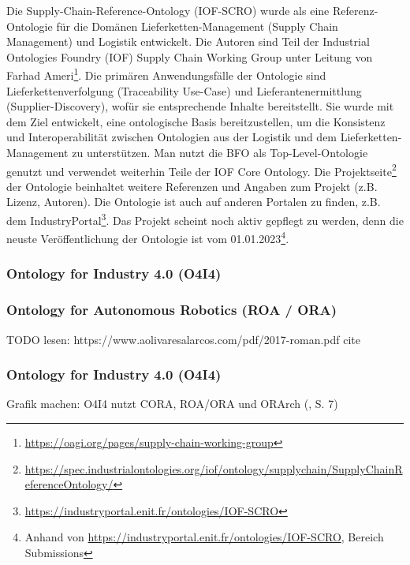 \documentclass{article}
\begin{document}
Die Supply-Chain-Reference-Ontology (IOF-SCRO) wurde als eine Referenz-Ontologie für die Domänen Lieferketten-Management (Supply Chain Management) und Logistik entwickelt\cite{ameri2020towards}.
Die Autoren sind Teil der Industrial Ontologies Foundry (IOF) Supply Chain Working Group unter Leitung von Farhad Ameri\footnote{\url{https://oagi.org/pages/supply-chain-working-group}}.
Die primären Anwendungsfälle der Ontologie sind Lieferkettenverfolgung (Traceability Use-Case) und Lieferantenermittlung (Supplier-Discovery), wofür sie entsprechende Inhalte bereitstellt.
Sie wurde mit dem Ziel entwickelt, eine ontologische Basis bereitzustellen, um die Konsistenz und Interoperabilität zwischen Ontologien aus der Logistik und dem Lieferketten-Management zu unterstützen.
Man nutzt die BFO als Top-Level-Ontologie genutzt und verwendet weiterhin Teile der IOF Core Ontology\cite{Kulvatunyou2022}.
Die Projektseite\footnote{\url{https://spec.industrialontologies.org/iof/ontology/supplychain/SupplyChainReferenceOntology/}} der Ontologie beinhaltet weitere Referenzen und Angaben zum Projekt (z.B. Lizenz, Autoren).
Die Ontologie ist auch auf anderen Portalen zu finden, z.B. dem IndustryPortal\footnote{\url{https://industryportal.enit.fr/ontologies/IOF-SCRO}}.
Das Projekt scheint noch aktiv gepflegt zu werden, denn die neuste Veröffentlichung der Ontologie ist vom 01.01.2023\footnote{Anhand von \url{https://industryportal.enit.fr/ontologies/IOF-SCRO}, Bereich Submissions}.

\subsubsection{Ontology for Industry 4.0 (O4I4)}

\cite{kumar2019ontologies}

\subsubsection{Ontology for Autonomous Robotics (ROA / ORA)}

TODO lesen: https://www.aolivaresalarcos.com/pdf/2017-roman.pdf
cite \cite{olszewska2017ontology}

\subsubsection{Ontology for Industry 4.0 (O4I4)}

\cite{kumar2019ontologies}

Grafik machen: O4I4 nutzt CORA, ROA/ORA und ORArch (\cite{kumar2019ontologies}, S. 7)
\end{document}
